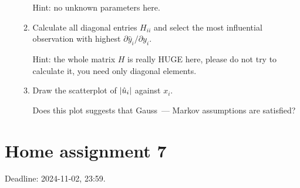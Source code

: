 \documentclass[12pt]{article}
\DeclarePairedDelimiter{\abs}{\lvert}{\rvert}
\begin{document}
\begin{enumerate}
\begin{enumerate}[resume]
    Hint: no unknown parameters here. 

    \item Calculate all diagonal entries $H_{ii}$ and select the most influential observation with highest $\partial \hat y_i /\partial y_i$.
    
    Hint: the whole matrix $H$ is really HUGE here, please do not try to calculate it, you need only diagonal elements. 

    \item Draw the scatterplot of $\abs{\hat u_i}$ against $x_i$. 
    
    Does this plot suggests that Gauss~— Markov assumptions are satisfied?
   \end{enumerate}

\end{enumerate}

\section*{Home assignment 7}

Deadline: 2024-11-02, 23:59.


\end{document}
